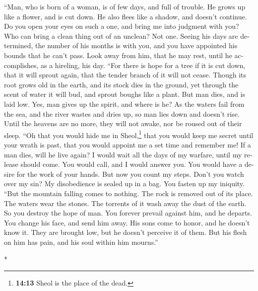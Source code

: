 \begin{paracol}{2}
\begin{otherlanguage}{english}
 ``Man, who is born of a woman, is of few days, and full
of trouble.  He grows up like a flower, and is cut down.
He also flees like a shadow, and doesn't continue.  Do you
open your eyes on such a one, and bring me into judgment with you?
 Who can bring a clean thing out of an unclean? Not one.
 Seeing his days are determined, the number of his months
is with you, and you have appointed his bounds that he can't pass.
 Look away from him, that he may rest, until he
accomplishes, as a hireling, his day.  ``For there is hope
for a tree if it is cut down, that it will sprout again, that the tender
branch of it will not cease.  Though its root grows old in
the earth, and its stock dies in the ground,  yet through
the scent of water it will bud, and sprout boughs like a plant.
 But man dies, and is laid low. Yes, man gives up the
spirit, and where is he?  As the waters fail from the
sea, and the river wastes and dries up,  so man lies down
and doesn't rise. Until the heavens are no more, they will not awake,
nor be roused out of their sleep.  ``Oh that you would
hide me in Sheol,\footnote{\textbf{14:13} Sheol is the place of the
  dead.} that you would keep me secret until your wrath is past, that
you would appoint me a set time and remember me!  If a
man dies, will he live again? I would wait all the days of my warfare,
until my release should come.  You would call, and I
would answer you. You would have a desire for the work of your hands.
 But now you count my steps. Don't you watch over my sin?
 My disobedience is sealed up in a bag. You fasten up my
iniquity.  ``But the mountain falling comes to nothing.
The rock is removed out of its place.  The waters wear
the stones. The torrents of it wash away the dust of the earth. So you
destroy the hope of man.  You forever prevail against
him, and he departs. You change his face, and send him away.
 His sons come to honor, and he doesn't know it. They are
brought low, but he doesn't perceive it of them.  But his
flesh on him has pain, and his soul within him mourns.''

\end{otherlanguage}

\switchcolumn[0]*

\hypertarget{eliphas-reprende-las-declaraciones-de-job-como-vanas-impuxedas-y-arrogantes-palabras-contra-dios}{%
}
\end{paracol}
